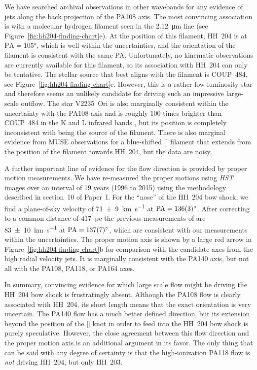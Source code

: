 \documentclass[twocolumn]{aastex63}
\begin{document}
We have searched archival observations in other wavebands
for any evidence of jets along the back projection of the PA108 axis.
The most convincing association is with a molecular hydrogen filament
seen in the \SI{2.12}{\micro m} line (see Figure~\ref{fig:hh204-finding-chart}e).
At the position of this filament, HH~204 is at \(\mathrm{PA} = \ang{105}\),
which is well within the uncertainties,
and the orientation of the filament is consistent with the same PA.\@
Unfortunately, no kinematic observations are currently available for this filament,
so its association with HH~204 can only be tentative.
The stellar source that best aligns with the  filament
is COUP~484, see Figure~\ref{fig:hh204-finding-chart}e.
However, this is a rather low luminosity star and therefore seems
an unlikely candidate for driving such an impressive large-scale outflow.
The star V2235~Ori is also marginally consistent within the uncertainty
with the PA108 axis and is roughly 100 times brighter than COUP~484
in the K and L infrared bands \citep{Muench:2002a},
but its position is completely inconsistent with being the source of the  filament.
There is also marginal evidence from MUSE observations \citep{Weilbacher:2015a}
for a blue-shifted [] filament that extends
from the position of the  filament towards HH~204, but the data are noisy. 

A further important line of evidence for the flow direction is provided
by proper motion measurements.
We have re-measured the proper motions using \emph{HST} images over an interval of 19 years (1996 to 2015) using the methodology described in section~10 of Paper~I.
For the ``nose'' of the HH~204 bow shock, we find a plane-of-sky velocity of \SI{71 \pm 9}{km.s^{-1}}
at \(\mathrm{PA} = \ang{136 \pm 3}\).
After correcting to a common distance of \SI{417}{pc}
the previous measurements of \citet{Doi:2002v} are \SI{83 \pm 10}{km.s^{-1}}
at \(\mathrm{PA} = \ang{137 \pm 7}\),
which are consistent with our measurements within the uncertainties.
The proper motion axis is shown by a large red arrow in Figure~\ref{fig:hh204-finding-chart}b
for comparison with the candidate axes from the high radial velocity jets.
It is marginally consistent with the PA140 axis, but not all with the
PA108, PA118, or PA164 axes. 

In summary, convincing evidence for which large scale flow might be driving the
HH~204 bow shock is frustratingly absent.
Although the PA108 flow is clearly associated with HH~204, its short length means
that the exact orientation is very uncertain.
The PA140 flow has a much better defined direction,
but its extension beyond the position of the [] knot
in order to feed into the HH~204 bow shock is purely speculative.
However, the close agreement between this flow direction
and the proper motion axis is an additional argument in its favor.
The only thing that can be said with any degree of certainty is that the
high-ionization PA118 flow is \emph{not} driving HH~204, but only HH~203.
\end{document}
